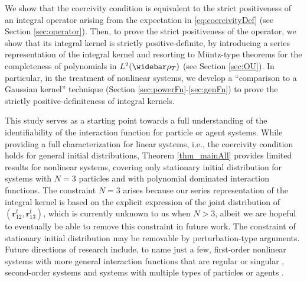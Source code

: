 \documentclass[]{elsarticle}
\def\R{\mathbb{R}}
\def\E{\mathbb{E}}
\newcommand{\wbar}\widebar
\newcommand{\mbf}[1]{\boldsymbol{#1}}
\newcommand{\innerp}[2]{\langle #1,#2 \rangle}
\newcommand{\br}{\mbf{r}}
\numberwithin{equation}{section}
\numberwithin{theorem}{section}
\begin{document}
We  show that the coercivity condition is equivalent to the strict positiveness of an integral operator arising from the expectation in \eqref{eq:coercivityDef} (see Section \ref{sec:operator}). 
Then, to prove the strict positiveness of the operator, we show that its integral kernel is strictly positive-definite, by introducing a series representation of the integral kernel and resorting to M\"untz-type theorems for the completeness of polynomials in $L^2(\wbar \rho_T)$  (see Section \ref{sec:OU}). In particular, in the treatment of nonlinear systems, we develop a ``comparison to a Gaussian kernel'' technique (Section \ref{sec:powerFn}-\ref{sec:genFn}) to prove the strictly positive-definiteness of integral kernels. 


\bigskip
This study serves as a starting point towards a full understanding of the identifiability of the interaction function for particle or agent systems. While providing a full characterization for linear systems, i.e., the coercivity condition holds for general initial distributions, Theorem \ref{thm_mainAll} provides limited results for nonlinear systems, covering only stationary initial distribution for systems with $N=3$ particles and with polynomial dominated interaction functions. The constraint $N=3$ arises because our series representation of the integral kernel is based on the explicit expression of the joint distribution of $(\br_{12}^t, \br_{13}^t)$, which is currently unknown to us when $N>3$, albeit we are hopeful to eventually be able to remove this constraint in future work. The constraint of stationary initial distribution may be removable by perturbation-type arguments. Future directions of research include, to name just a few, first-order nonlinear systems with more general interaction functions that are regular \cite{huang2019learning, LZTM19} or singular \cite{liu2016propagation,li2019mean}, second-order systems and systems with multiple types of particles or agents \cite{LMT19}.
\end{document}

